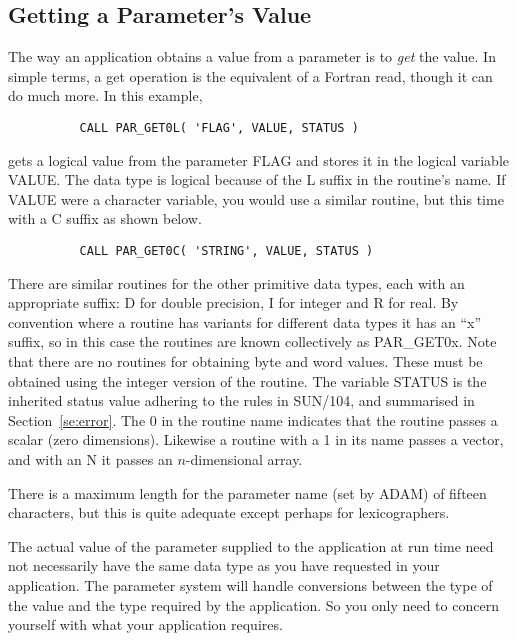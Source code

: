 \documentclass[twoside,11pt]{article}
\newcommand{\xref}[3]{#1}
\newcommand{\xlabel}[1]{}
\begin{document}
\subsection{\xlabel{getting_a_parameters_value}Getting a Parameter's Value}

The way an application obtains a value from a parameter is to {\it
get\/} the value.  In simple terms, a get operation is the equivalent of
a Fortran read, though it can do much more.  In this example,

\begin{verbatim}
          CALL PAR_GET0L( 'FLAG', VALUE, STATUS )
\end{verbatim}

gets a logical value from the parameter FLAG and stores it in the
logical variable VALUE.  The data type is logical because of the L
suffix in the routine's name.  If VALUE were a character variable, you
would use a similar routine, but this time with a C suffix as shown below.

\begin{verbatim}
          CALL PAR_GET0C( 'STRING', VALUE, STATUS )
\end{verbatim} 

There are similar routines for the other primitive data types, each with
an appropriate suffix: D for double precision, I for integer and R for
real.  By convention where a routine has variants for different data
types it has an ``x'' suffix, so in this case the routines are known
collectively as PAR\_GET0x.  Note that there are no routines for
obtaining byte and word values.  These must be obtained using the
integer version of the routine.  The variable STATUS is the inherited
status value adhering to the rules in 
\xref{SUN/104}{sun104}{},
and summarised in
Section~\ref{se:error}.  The 0 in the routine name indicates that the
routine passes a scalar (zero dimensions).  Likewise a routine with a 1
in its name passes a vector, and with an N it passes an $n$-dimensional
array. 

There is a maximum length for the parameter name (set by {\footnotesize
ADAM}) of fifteen characters, but this is quite adequate except
perhaps for lexicographers.

The actual value of the parameter supplied to the application at run
time need not necessarily have the same data type as you have requested
in your application. The parameter system will handle conversions
between the type of the value and the type required by the
application.  So you only need to concern yourself with what your
application requires. 
\end{document}
